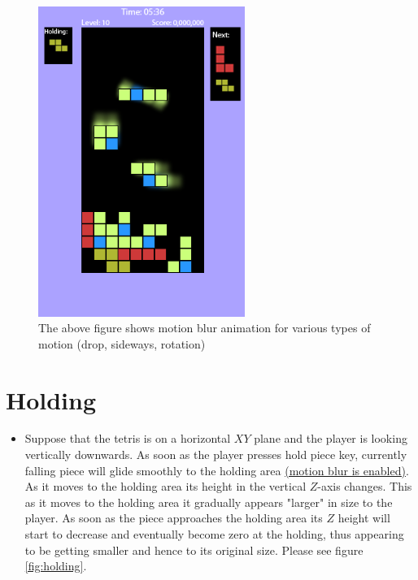 \documentclass[10pt]{report}
\theoremstyle{definition}
\theoremstyle{remark}
\begin{document}
\begin{figure}
\label{fig:animation}
  \centering
    \includegraphics[width=0.6\textwidth]{animation}
    \caption[Movement Animation]{The above figure shows motion blur animation for various types of motion (drop, sideways, rotation)}
\end{figure}

\section{Holding}
\begin{itemize}
\item Suppose that the tetris is on a horizontal $XY$ plane and the player is looking vertically downwards. As soon as the player presses hold piece key, currently falling piece will glide smoothly to the holding area \underline{(motion blur is enabled)}. As it moves to the holding area its height in the vertical $Z$-axis changes. This as it moves to the holding area it gradually appears "larger" in size to the player. As soon as the piece approaches the holding area its $Z$ height will start to decrease and eventually become zero at the holding, thus appearing to be getting smaller and hence to its original size. Please see figure \ref{fig:holding}.
\end{itemize}
\end{document}
